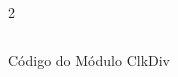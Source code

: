 \begin{figure}[H]
    \centering   
    \begin{tcolorbox}  
        \begin{multicols}{2} 
        \fontsize{9pt}{9pt}\selectfont\inputminted[obeytabs=true,tabsize=4,xleftmargin=20pt,linenos,breaklines]{VHDL}{VHDL/files/clkdiv.vhd}    
        \end{multicols}
    \end{tcolorbox}   
    \caption{Código do Módulo ClkDiv}
\end{figure}